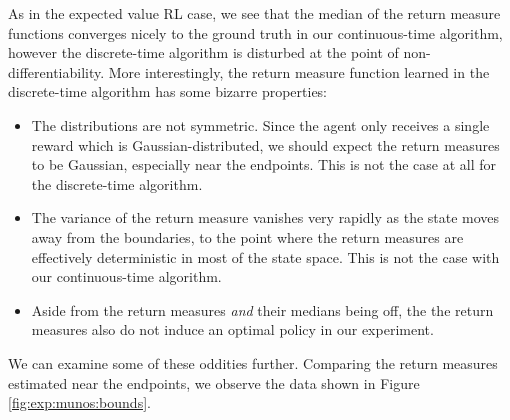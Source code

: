 As in the expected value RL case, we see that the median of the return
measure functions converges nicely to the ground truth in our
continuous-time algorithm, however the discrete-time algorithm is
disturbed at the point of non-differentiability. More interestingly,
the return measure function learned in the discrete-time algorithm has
some bizarre properties:
\begin{itemize}
\item The distributions are not symmetric. Since the agent only
  receives a single reward which is Gaussian-distributed, we should
  expect the return measures to be Gaussian, especially near the
  endpoints. This is not the case at all for the discrete-time
  algorithm.
\item The variance of the return measure vanishes very rapidly as
  the state moves away from the boundaries, to the point where the
  return measures are effectively deterministic in most of the state
  space. This is not the case with our continuous-time algorithm.
\item Aside from the return measures \emph{and} their medians being
  off, the the return measures also do not induce an optimal policy in
  our experiment.
\end{itemize}

We can examine some of these oddities further. Comparing the return
measures estimated near the endpoints, we observe the data shown in
Figure \ref{fig:exp:munos:bounds}.

